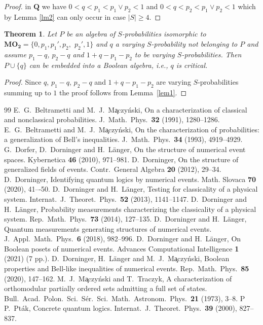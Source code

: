 \documentclass[12pt]{article}
\newtheorem{theorem}{Theorem}[section]
\begin{document}
\begin{proof}
in $\mathbf Q$ we have $0<q<p_1<p_1\vee p_2<1$ and $0<q<p_2<p_1\vee p_2<1$ which by Lemma \ref{lm2} can only occur in case $|S|\ge4$. 
\end{proof}

\begin{theorem}\label{th7}
Let $P$ be an algebra of $S$-probabilities isomorphic to $\mathbf{MO_2}=\{0,p_1,p_1',p_2,$ $p_2',1\}$ and $q$ a varying $S$-probability not belonging to $P$ and assume $p_1-q$, $p_2-q$ and $1+q-p_1-p_2$ to be varying $S$-probabilities. Then $P\cup\{q\}$ can be embedded into a Boolean algebra, i.e., $q$ is critical.
\end{theorem}

\begin{proof}
Since $q$, $p_1-q$, $p_2-q$ and $1+q-p_1-p_2$ are varying $S$-probabilities summing up to $1$ the proof follows from Lemma~\ref{lem1}.
\end{proof}

\begin{thebibliography}{99}
E.~G.~Beltrametti and M.~J.~M\c aczy\'nski, On a characterization of classical and nonclassical probabilities. J.\ Math.\ Phys.\ {\bf32} (1991), 1280--1286.
E.~G.~Beltrametti and M.~J.~M\c aczy\'nski, On the characterization of probabilities: a generalization of Bell's inequalities. J.\ Math.\ Phys.\ {\bf 34} (1993), 4919--4929.
G.~Dorfer, D.~Dorninger and H.~L\"anger, On the structure of numerical event spaces. Kybernetica {\bf46} (2010), 971--981.
D.~Dorninger, On the structure of generalized fields of events. Contr.\ General Algebra {\bf20} (2012), 29--34.
D.~Dorninger, Identifying quantum logics by numerical events. Math. Slovaca {\bf70} (2020), 41–-50.
D.~Dorninger and H.~L\"anger, Testing for classicality of a physical system. Internat.\ J.\ Theoret.\ Phys.\ {\bf52} (2013), 1141--1147.
D.~Dorninger and H.~L\"anger, Probability measurements characterizing the classicality of a physical system. Rep.\ Math.\ Phys.\ {\bf73} (2014), 127--135.
D.~Dorninger and H.~L\"anger, Quantum measurements generating structures of numerical events. J.\ Appl.\ Math.\ Phys.\ {\bf6} (2018), 982--996.
D.~Dorninger and H.~L\"anger, On Boolean posets of numerical events. Advances Computational Intelligence {\bf1} (2021) (7 pp.).
D.~Dorninger, H.~L\"anger and M.~J.~M\c aczy\'nski, Boolean properties and Bell-like inequalities of numerical events. Rep.\ Math.\ Phys.\ {\bf85} (2020), 147--162.
M.~J.~M\c aczy\'nski and T.~Traczyk, A characterization of orthomodular partially ordered sets admitting a full set of states. Bull.\ Acad.\ Polon.\ Sci.\ S\'er.\ Sci.\ Math.\ Astronom.\ Phys.\ {\bf 21} (1973), 3--8.
\bibitem P
P.~Pt\'ak, Concrete quantum logics. Internat.\ J.\ Theoret.\ Phys.\ {\bf39} (2000), 827--837.
\end{thebibliography}
\end{document}
